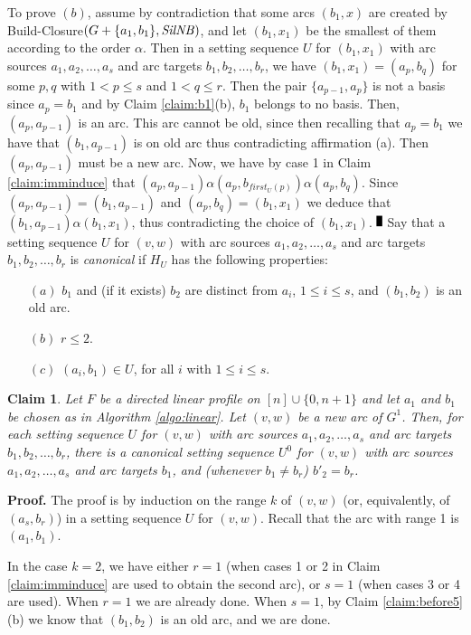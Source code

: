 \documentclass{article}
\newcommand{\Sil}{{\it SilNB}}
\newtheorem{fait}{Claim}
\newcommand{\bfn}{\begin{fait}}
\newcommand{\efn}{\end{fait}}
\renewcommand{\Box}{\rule{1.5mm}{3mm}}
\begin{document}
To prove $(b)$, assume by contradiction that some arcs $(b_1,x)$ are  created by 
Build-Closure$(G+\{a_1,b_1\},\Sil)$, and let $(b_1,x_1)$ be the smallest of them according
to the order $\alpha$. Then in a setting sequence $U$ for $(b_1,x_1)$ with arc sources  
$a_1, a_2, \ldots, a_s$ and arc targets $b_1, b_2, \ldots, b_r$, we have $(b_1,x_1)=(a_p,b_q)$
for some $p,q$ with $1< p\leq s$ and $1< q\leq r$. Then the pair $\{a_{p-1},a_p\}$ is
not a basis since $a_p=b_1$ and by Claim \ref{claim:b1}(b), $b_1$ belongs to no basis. 
Then, $(a_p,a_{p-1})$ is an arc. This arc cannot be old, since then recalling that
$a_p=b_1$ we have that $(b_1,a_{p-1})$ is on old arc thus contradicting affirmation (a).
Then $(a_p,a_{p-1})$ must be a new arc. Now, we have by case 1 in Claim \ref{claim:imminduce}  that $(a_p,a_{p-1})\alpha (a_p,b_{first_U(p)})\alpha (a_p,b_q)$. Since $(a_p,a_{p-1})=(b_1,a_{p-1})$ and $(a_p,b_q)=(b_1,x_1)$
we deduce that $(b_1,a_{p-1})\alpha (b_1,x_1)$, thus contradicting the choice of $(b_1,x_1)$. $\Box$
\bigskip
Say that a setting sequence $U$ for $(v,w)$ with arc sources $a_1, a_2, \ldots, a_s$ and arc targets $b_1, b_2, \ldots, b_r$ is {\em canonical} if $H_U$ has the following properties:

\begin{enumerate}
\item[$(a)$] $b_1$ and (if it exists) $b_2$ are distinct from $a_i$, $1\leq i\leq s$, and $(b_1,b_2)$ is an old arc.
\item[$(b)$] $r\leq 2$.  
\item[$(c)$] $(a_i,b_1)\in U$, for all $i$ with $1\leq i\leq s$. 
\end{enumerate} 

\bfn
Let $F$ be a directed linear profile on  $[n]\cup\{0,n+1\}$ and
let  $a_1$ and $b_1$ be chosen as in  Algorithm \ref{algo:linear}. 
Let $(v,w)$ be a new arc of $G^1$.  Then, for each setting sequence $U$ for $(v,w)$ with
arc sources $a_1, a_2, \ldots, a_s$ and arc targets $b_1, b_2, \ldots, b_r$,
there is a canonical setting sequence $U^0$ for $(v,w)$ with arc sources 
$a_1, a_2, \ldots, a_s$ and arc targets $b_1$, and (whenever $b_1\neq b_r$) 
$b'_2=b_r$. 
\label{claim:shortpath}
\efn

{\bf Proof.} The proof is by induction on the range $k$ of $(v,w)$ (or, equivalently, of
$(a_s,b_r)$) in a setting sequence $U$ for $(v,w)$. Recall that the arc with range 1 
is $(a_1,b_1)$.

In the case $k=2$, we have either $r=1$ (when cases 1 or 2 in Claim 
\ref{claim:imminduce} are used to obtain the second arc), or $s=1$ (when cases 3 or 4 
are used).  When $r=1$ we are already done. When $s=1$, by Claim \ref{claim:before5}(b)
we know that $(b_1,b_2)$ is an old arc, and we are done.
\end{document}
